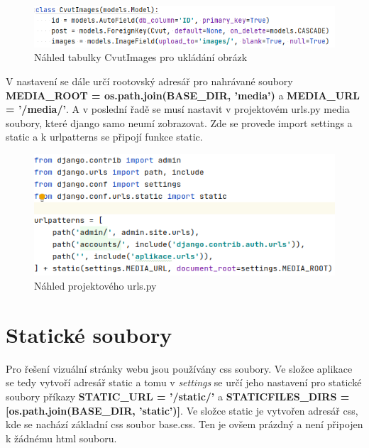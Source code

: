 \begin{figure}[H] \centering
    \includegraphics[width=430pt]{./pictures/9-db-cvutimages.PNG}
    \caption[Náhled tabulky CvutImages pro ukládání obrázků]{Náhled tabulky CvutImages pro ukládání obrázk}
	\label{fig:Náhled tabulky CvutImages pro ukládání obrázk}              
\end{figure}

V nastavení se dále určí rootovský adresář pro nahrávané soubory \textbf{MEDIA\_ROOT = os.path.join(BASE\_DIR, 'media')} a \textbf{MEDIA\_URL = '/media/'}.
A v poslední řadě se musí nastavit v projektovém urls.py media soubory, které django samo neumí zobrazovat. Zde se provede import settings a static a k urlpatterns se připojí funkce static. 

\begin{figure}[H] \centering
    \includegraphics[width=350pt]{./pictures/10-media-urlspy.PNG}
    \caption[Náhled projektového urls.py]{Náhled projektového urls.py}
	\label{fig:Náhled projektového urls.py}              
\end{figure}

\newpage

\section{Statické soubory}

Pro řešení vizuální stránky webu jsou používány css soubory. Ve složce aplikace se tedy vytvoří adresář static a tomu v \emph{settings} se určí jeho nastavení pro statické soubory příkazy \textbf{STATIC\_URL = '/static/'} a \textbf{STATICFILES\_DIRS = [os.path.join(BASE\_DIR, 'static')]}. Ve složce static je vytvořen adresář css, kde se nachází základní css soubor base.css. Ten je ovšem prázdný a není připojen k žádnému html souboru.

